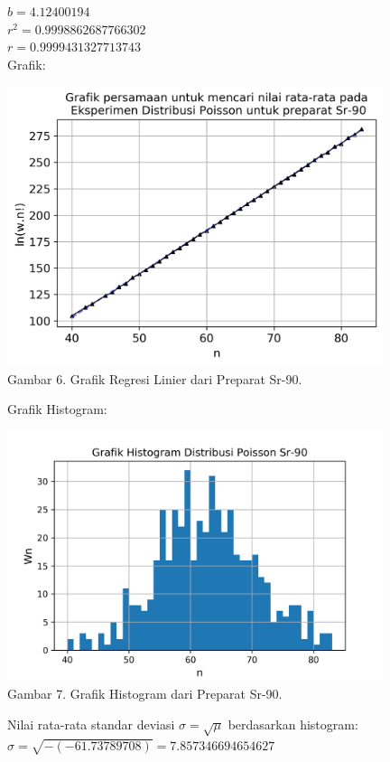 \documentclass{article}
\begin{document}
			$b =4.12400194 $ \\
			$r^{2} = 0.9998862687766302$ \\
			$r = 0.9999431327713743$ \\ 
			Grafik: 
			\begin{center}
				\includegraphics[width=110mm]{Data/Sr-90-Graph.png}\\
				Gambar 6. Grafik Regresi Linier dari Preparat Sr-90.
			\end{center}\newpage
			Grafik Histogram:
			\begin{center}
				\includegraphics[width=110mm]{Data/Sr-90.png}\\
				Gambar 7. Grafik Histogram dari Preparat Sr-90.
			\end{center} 
			Nilai rata-rata standar deviasi $\sigma = \sqrt{\mu}$ berdasarkan histogram:\\
			$\sigma = \sqrt{-(-61.73789708)} = 7.857346694654627$
				
\end{document}
